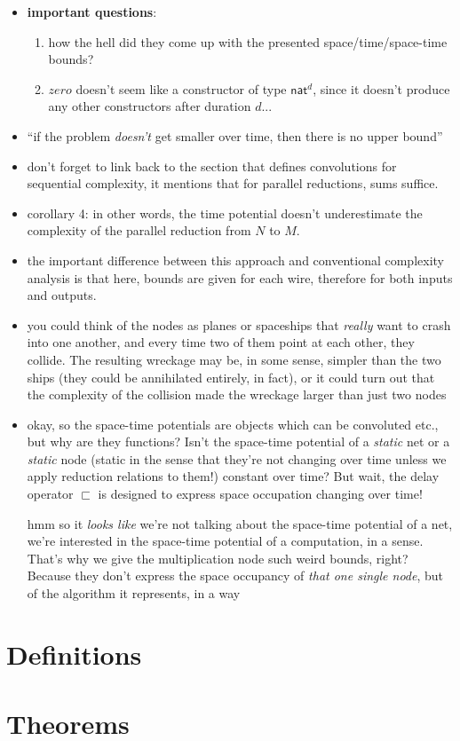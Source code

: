\documentclass{fit-teorsem}
\begin{document}
\begin{itemize}
	\item \textbf{important questions}:
		\begin{enumerate}
			\item how the hell did they come up with the presented space/time/space-time bounds?
			\item $zero$ doesn't seem like a constructor of type $\mathsf{nat}^d$, since it doesn't
				produce any other constructors after duration $d$...
		\end{enumerate}
	\item ``if the problem \textit{doesn't} get smaller over time, then there is no upper bound''
	\item don't forget to link back to the section that defines convolutions for sequential complexity,
		it mentions that for parallel reductions, sums suffice.
	\item corollary 4: in other words, the time potential doesn't underestimate the complexity of the
		parallel reduction from $N$ to $M$.
	\item the important difference between this approach and conventional complexity analysis is that
		here, bounds are given for each wire, therefore for both inputs and outputs.
	\item you could think of the nodes as planes or spaceships that \textit{really} want to crash
		into one another, and every time two of them point at each other, they collide.
		The resulting wreckage may be, in some sense, simpler than the two ships (they could be
		annihilated entirely, in fact), or it could turn out that the complexity of the collision
		made the wreckage larger than just two nodes
	\item okay, so the space-time potentials are objects which can be convoluted etc., but why are they
		functions? Isn't the space-time potential of a \textit{static} net or a \textit{static} node
		(static in the sense that they're not changing over time unless we apply reduction relations
		to them!) constant over time? But wait, the delay operator $\sqsubset$ is designed to express
		space occupation changing over time!

		hmm so it \textit{looks like} we're not talking about the space-time potential of a net,
		we're interested in the space-time potential of a computation, in a sense. That's why
		we give the multiplication node such weird bounds, right? Because they don't express
		the space occupancy of \textit{that one single node}, but of the algorithm it represents,
		in a way
\end{itemize}

\section*{Definitions}

\section*{Theorems}
\end{document}
